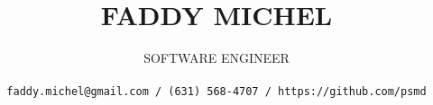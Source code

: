 \title{\uppercase{Faddy Michel}}
\author{\uppercase{Software Engineer}\\ \\
\texttt{faddy.michel@gmail.com / (631) 568-4707 / https://github.com/psmd}
}
\date{}
\maketitle
